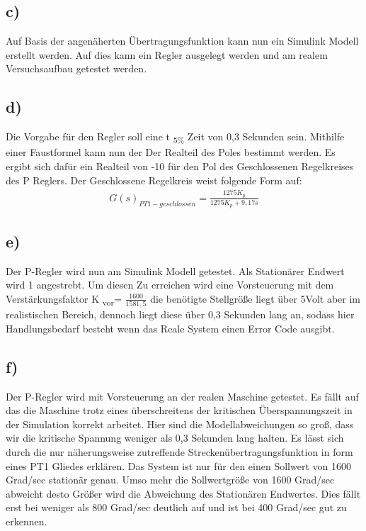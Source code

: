 \documentclass[10pt]{scrartcl}
\begin{document}
\subsection{c)}	Auf Basis der angenäherten Übertragungsfunktion kann nun ein Simulink Modell erstellt werden. Auf dies kann ein Regler ausgelegt werden und am realem Versuchsaufbau getestet werden.
\subsection{d)}	Die Vorgabe für den Regler soll eine t \textsubscript{5\%} Zeit von 0,3 Sekunden sein. Mithilfe einer Faustformel kann nun der Der Realteil des Poles bestimmt werden. Es ergibt sich dafür ein Realteil von -10 für den Pol des Geschlossenen Regelkreises des P Reglers. Der Geschlossene Regelkreis weist folgende Form auf:
\begin{align}
   G(s)_{PT1-geschlossen}=\frac{1275K_p}{1275K_p+9,17s}
\end{align}
\subsection{e)}	Der P-Regler wird nun am Simulink Modell getestet. Als Stationärer Endwert wird 1 angestrebt. Um diesen Zu erreichen wird eine Vorsteuerung mit dem Verstärkungsfaktor K \textsubscript{vor}= $ \frac{1600}{1581,5} $ die benötigte Stellgröße liegt über 5Volt aber im realistischen Bereich, dennoch liegt diese über 0,3 Sekunden lang an, sodass hier Handlungsbedarf besteht wenn das Reale System einen Error Code ausgibt.
\subsection{f)}	Der P-Regler wird mit Vorsteuerung an der realen Maschine getestet. Es fällt auf das die Maschine trotz eines überschreitens der kritischen Überspannungszeit in der Simulation korrekt arbeitet. Hier sind die Modellabweichungen so groß, dass wir die kritische Spannung weniger als 0,3 Sekunden  lang halten. Es lässt sich durch die nur näherungsweise zutreffende Streckenübertragungsfunktion in form eines PT1 Gliedes erklären. Das System ist nur für den einen Sollwert von 1600 Grad/sec stationär genau. Umso mehr die Sollwertgröße von 1600 Grad/sec abweicht desto Größer wird die Abweichung des Stationären Endwertes. Dies fällt erst bei weniger als 800 Grad/sec deutlich auf und ist bei 400 Grad/sec gut zu erkennen.
\end{document}
